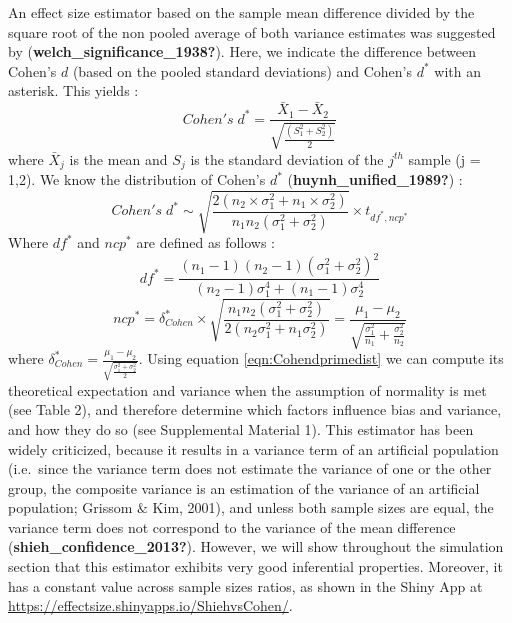 \documentclass[
  english,
  man]{apa6}
\begin{document}
An effect size estimator based on the sample mean difference divided by the square root of the non pooled average of both variance estimates was suggested by (\textbf{welch\_significance\_1938?}). Here, we indicate the difference between Cohen's \(d\) (based on the pooled standard deviations) and Cohen's \(d^*\) with an asterisk. This yields :
\begin{equation*} 
Cohen's \; d^* = \frac{\bar{X}_{1} - \bar{X}_{2}}{ \sqrt{\frac{\left(S^2_{1}+S^2_{2} \right)}{2}}}
\label{eqn:Cohenprimeds}
\end{equation*}
where \(\bar{X}_{j}\) is the mean and \(S_j\) is the standard deviation of the \(j^{th}\) sample (j = 1,2). We know the distribution of Cohen's \(d^*\) (\textbf{huynh\_unified\_1989?}) :
\begin{equation} 
Cohen's \; d^* \sim  \sqrt{\frac{2(n_2\times\sigma^2_1+n_1\times\sigma^2_2)}{n_1n_2(\sigma^2_1+\sigma^2_2)}} \times t_{df^*,ncp^*}
\label{eqn:Cohendprimedist}
\end{equation}
Where \(df^*\) and \(ncp^*\) are defined as follows :
\begin{equation} 
df^* = \frac{(n_1-1)(n_2-1)(\sigma^2_1+\sigma^2_2)^2}{(n_2-1)\sigma^4_1+(n_1-1)\sigma^4_2}
\label{eqn:Cohendprimedf}
\end{equation}
\begin{equation*} 
ncp^*=\delta^*_{Cohen} \times \sqrt{\frac{n_1n_2(\sigma^2_1+\sigma^2_2)}{2(n_2\sigma^2_1+n_1\sigma^2_2)}}=\frac{\mu_1-\mu_2}{\sqrt{\frac{\sigma_1^2}{n_1}+\frac{\sigma^2_2}{n_2}}}
\label{eqn:Cohendprimevst}
\end{equation*}
where \(\delta^*_{Cohen}=\frac{\mu_1-\mu_2}{\sqrt{\frac{\sigma^2_1+\sigma^2_2}{2}}}\). Using equation \ref{eqn:Cohendprimedist} we can compute its theoretical expectation and variance when the assumption of normality is met (see Table 2), and therefore determine which factors influence bias and variance, and how they do so (see Supplemental Material 1). This estimator has been widely criticized, because it results in a variance term of an artificial population (i.e.~since the variance term does not estimate the variance of one or the other group, the composite variance is an estimation of the variance of an artificial population; Grissom \(\&\) Kim, 2001), and unless both sample sizes are equal, the variance term does not correspond to the variance of the mean difference (\textbf{shieh\_confidence\_2013?}). However, we will show throughout the simulation section that this estimator exhibits very good inferential properties. Moreover, it has a constant value across sample sizes ratios, as shown in the Shiny App at \url{https://effectsize.shinyapps.io/ShiehvsCohen/}.
\end{document}
